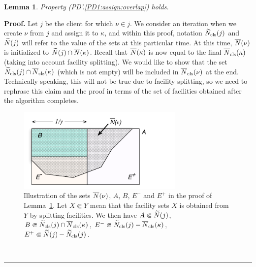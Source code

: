 \documentclass[oneside,final]{ucr}
\newtheorem{lemma}[theorem]{Lemma}
\newenvironment{proof}[1][Proof]{\textbf{#1.} }{\ \rule{0.5em}{0.5em}}
\begin{document}

\begin{lemma} \label{lem: PD1: primary overlap}
  Property (PD'.\ref{PD1:assign:overlap}) holds.
\end{lemma}

\begin{proof}
  Let $j$ be the client for which $\nu\in j$. We consider an iteration
  when we create $\nu$ from $j$ and assign it to $\kappa$, and
  within this proof, notation ${\widetilde N}_{{\mbox{\scriptsize\rm cls}}}(j)$ and ${\widetilde N}(j)$
  will refer to the value of the sets at this particular time.  
At this time, ${\overline{N}}(\nu)$ is initialized to ${\widetilde N}(j)\cap
  {\overline{N}}(\kappa)$.  Recall that ${\overline{N}}(\kappa)$ is now equal to the
  final ${\overline{N}}_{{\mbox{\scriptsize\rm cls}}}(\kappa)$ (taking into account facility splitting). We
  would like to show that the set ${\widetilde N}_{{\mbox{\scriptsize\rm cls}}}(j)\cap
  {\overline{N}}_{{\mbox{\scriptsize\rm cls}}}(\kappa)$ (which is not empty) will be included in
  ${\overline{N}}_{{\mbox{\scriptsize\rm cls}}}(\nu)$ at the end. Technically speaking, this will not be
  true due to facility splitting, so we need to rephrase this claim
  and the proof in terms of the set of facilities obtained after the
  algorithm completes.

\begin{figure}[ht]
\begin{center}
\includegraphics[width=3.2in]{proof_of_lemma_PD'3a.pdf}
\caption[Illustration of the sets in the proof of
Lemma~\ref{lem: PD1: primary overlap}]{Illustration of the
  sets ${\overline{N}}(\nu)$, $A$, $B$, $E^-$ and $E^+$ in the proof
  of Lemma~\ref{lem: PD1: primary overlap}. Let $X \Subset
  Y$ mean that the facility sets $X$ is obtained from $Y$ by
  splitting facilities.  We then have $A \Subset
  {\widetilde N}(j)$, $B \Subset {\widetilde N}_{{\mbox{\scriptsize\rm cls}}}(j) \cap
  {\overline{N}}_{{\mbox{\scriptsize\rm cls}}}(\kappa)$, $E^- \Subset {\widetilde N}_{{\mbox{\scriptsize\rm cls}}}(j) -
  {\overline{N}}_{{\mbox{\scriptsize\rm cls}}}(\kappa)$, $E^+ \Subset {\widetilde N}(j) -
  {\widetilde N}_{{\mbox{\scriptsize\rm cls}}}(j)$.}
\label{fig: sets lemma PD'3a}
\end{center}
\end{figure}


\end{proof}
\end{document}
